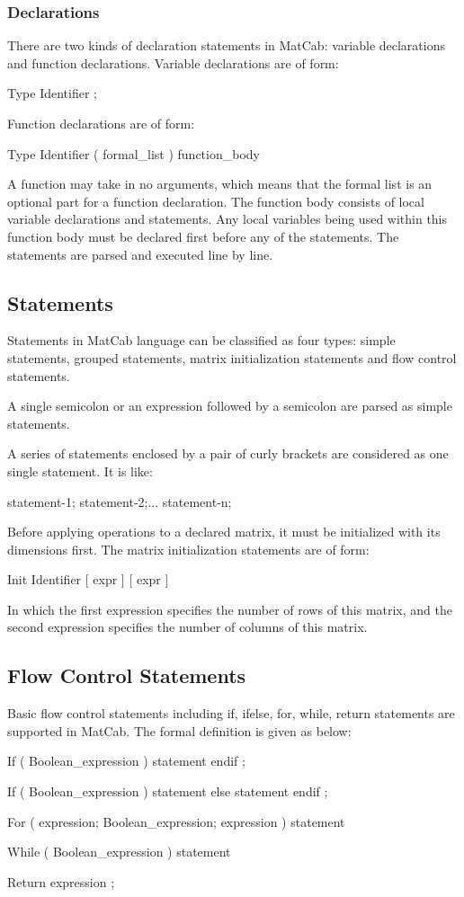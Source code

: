 \documentclass[12pt]{article} %
\begin{document}
\subsubsection{Declarations}
There are two kinds of declaration statements in MatCab: variable declarations and function declarations.
Variable declarations are of form: \begin{center}Type Identifier ;\end{center}
Function declarations are of form: \begin{center}Type Identifier ( formal\_list ) { function\_body }\end{center}
A function may take in no arguments, which means that the formal list is an optional part for a function declaration. The function body consists of local variable declarations and statements. Any local variables being used within this function body must be declared first before any of the statements. The statements are parsed and executed line by line.

\subsection{Statements}
Statements in MatCab language can be classified as four types: simple statements, grouped statements, matrix initialization statements and flow control statements.

A single semicolon or an expression followed by a semicolon are parsed as simple statements.

A series of statements enclosed by a pair of curly brackets are considered as one single statement. It is like:
\begin{center} { statement-1; statement-2;... statement-n; } \end{center}

Before applying operations to a declared matrix, it must be initialized with its dimensions first. The matrix initialization statements are of form:
\begin{center} Init Identifier [ expr ] [ expr ]  \end{center}
In which the first expression specifies the number of rows of this matrix, and the second expression specifies the number of columns of this matrix.

\subsection{Flow Control Statements}
Basic flow control statements including if, ifelse, for, while, return statements are supported in MatCab. The formal definition is given as below:
\begin{center} 
If ( Boolean\_expression ) statement endif ;

If ( Boolean\_expression ) statement else statement endif ;

For ( expression; Boolean\_expression; expression ) statement

While ( Boolean\_expression ) statement

Return expression ;
\end{center}
\end{document}
